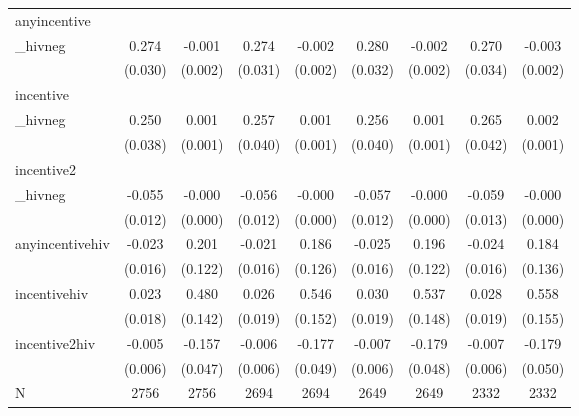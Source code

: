 \begin{tabular}{lcccccccc}
\hline
anyincentive\\_hivneg & 0.274 & -0.001 & 0.274 & -0.002 & 0.280 & -0.002 & 0.270 & -0.003 \\
 & (0.030) & (0.002) & (0.031) & (0.002) & (0.032) & (0.002) & (0.034) & (0.002) \\
incentive\\_hivneg & 0.250 & 0.001 & 0.257 & 0.001 & 0.256 & 0.001 & 0.265 & 0.002 \\
 & (0.038) & (0.001) & (0.040) & (0.001) & (0.040) & (0.001) & (0.042) & (0.001) \\
incentive2\\_hivneg & -0.055 & -0.000 & -0.056 & -0.000 & -0.057 & -0.000 & -0.059 & -0.000 \\
 & (0.012) & (0.000) & (0.012) & (0.000) & (0.012) & (0.000) & (0.013) & (0.000) \\
anyincentivehiv & -0.023 & 0.201 & -0.021 & 0.186 & -0.025 & 0.196 & -0.024 & 0.184 \\
 & (0.016) & (0.122) & (0.016) & (0.126) & (0.016) & (0.122) & (0.016) & (0.136) \\
incentivehiv & 0.023 & 0.480 & 0.026 & 0.546 & 0.030 & 0.537 & 0.028 & 0.558 \\
 & (0.018) & (0.142) & (0.019) & (0.152) & (0.019) & (0.148) & (0.019) & (0.155) \\
incentive2hiv & -0.005 & -0.157 & -0.006 & -0.177 & -0.007 & -0.179 & -0.007 & -0.179 \\
 & (0.006) & (0.047) & (0.006) & (0.049) & (0.006) & (0.048) & (0.006) & (0.050) \\
\hline
N & 2756 & 2756 & 2694 & 2694 & 2649 & 2649 & 2332 & 2332 \\
\hline
\end{tabular}
